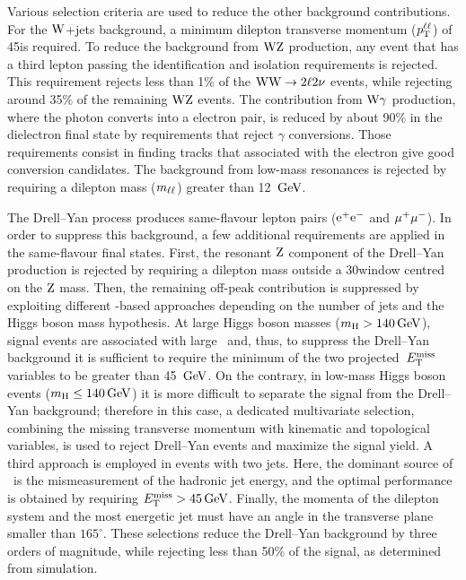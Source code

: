 \documentclass[11pt,twoside,a4paper,cmspaper,final,collab]{cms-tdr}
\begin{document}
Various selection criteria are used to reduce the other background contributions. For the $\mathrm{W}$+jets background,
a minimum dilepton transverse momentum ($p_{\mathrm{T}}^{\ell\ell}$) of 45\GeV is required.
To reduce the background from $\mathrm{W}\mathrm{Z}$ production, any event
that has a third lepton passing the identification and isolation requirements is rejected.
This requirement rejects less than 1\% of the $\mathrm{W}\mathrm{W} \to 2\ell2\nu$ events, while
rejecting around 35\% of the remaining $\mathrm{W}\mathrm{Z}$ events.
The contribution from $\mathrm{W}\gamma$ production,
where the photon converts into a electron pair, is reduced by about 90\%
in the dielectron final state by  requirements that reject $\gamma$ conversions.
Those requirements consist in finding tracks that associated with the
electron give good conversion candidates.
The background from low-mass resonances is rejected by requiring a dilepton mass ($m_{\ell\ell}$) greater
than 12 $\,\text{Ge\hspace{-.08em}V}$.

The Drell--Yan process produces same-flavour lepton pairs ($\mathrm{e}^+\mathrm{e}^-$ and ${\mu^+}{\mu^-}$). In order
to suppress this background, a few additional requirements are applied in the same-flavour final states.
First, the resonant $\mathrm{Z}$ component of the Drell--Yan production is rejected by requiring
a dilepton mass outside a 30\GeV window centred on the $\mathrm{Z}$ mass.
Then, the remaining off-peak contribution is suppressed by exploiting different \MET-based approaches depending
on the number of jets and the Higgs boson mass hypothesis.
At large Higgs boson masses ($m_{\mathrm{H}} > 140\,\text{Ge\hspace{-.08em}V}$), signal events are associated with large \MET\ and, thus,
to suppress the Drell--Yan background it is sufficient to require the minimum of the
two projected~$E_{\mathrm{T}}^{\text{miss}}$ variables to be greater than 45 $\,\text{Ge\hspace{-.08em}V}$.
On the contrary, in low-mass Higgs boson events ($m_{\mathrm{H}} \leq 140\,\text{Ge\hspace{-.08em}V}$) it is more difficult to separate the signal from the Drell--Yan background;
therefore in this case, a dedicated multivariate selection, combining the missing transverse momentum with kinematic and topological variables, is used to
reject Drell--Yan events and maximize the signal yield.
A third approach is employed in events with two jets. Here, the dominant source of \MET\ is the mismeasurement of the hadronic jet energy,
and the optimal performance is obtained by requiring $E_{\mathrm{T}}^{\text{miss}} > 45\,\text{Ge\hspace{-.08em}V}$.
Finally, the momenta of the dilepton system and the most energetic jet must have an angle
in the transverse plane smaller than $165^\circ$. These selections reduce the Drell--Yan
background by three orders of magnitude, while rejecting less than 50\% of the signal, as determined from simulation.
\end{document}
